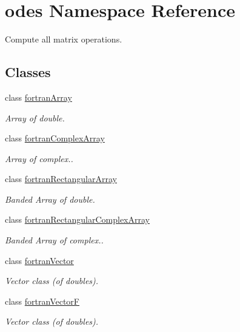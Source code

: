 \hypertarget{namespaceodes}{\section{odes Namespace Reference}
\label{namespaceodes}
}


Compute all matrix operations.  


\subsection*{Classes}
\begin{DoxyCompactItemize}
\item 
class \hyperlink{classodes_1_1fortranArray}{fortran\-Array}
\begin{DoxyCompactList}\small\item\em Array of double. \end{DoxyCompactList}\item 
class \hyperlink{classodes_1_1fortranComplexArray}{fortran\-Complex\-Array}
\begin{DoxyCompactList}\small\item\em Array of complex.. \end{DoxyCompactList}\item 
class \hyperlink{classodes_1_1fortranRectangularArray}{fortran\-Rectangular\-Array}
\begin{DoxyCompactList}\small\item\em Banded Array of double. \end{DoxyCompactList}\item 
class \hyperlink{classodes_1_1fortranRectangularComplexArray}{fortran\-Rectangular\-Complex\-Array}
\begin{DoxyCompactList}\small\item\em Banded Array of complex.. \end{DoxyCompactList}\item 
class \hyperlink{classodes_1_1fortranVector}{fortran\-Vector}
\begin{DoxyCompactList}\small\item\em Vector class (of doubles). \end{DoxyCompactList}\item 
class \hyperlink{classodes_1_1fortranVectorF}{fortran\-Vector\-F}
\begin{DoxyCompactList}\small\item\em Vector class (of doubles). \end{DoxyCompactList}\item 

\end{DoxyCompactItemize}
